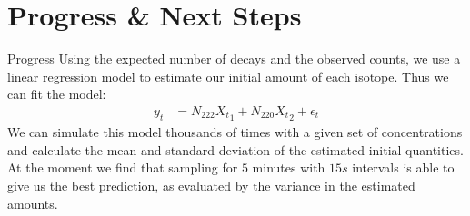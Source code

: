 \documentclass{beamer}
\begin{document}


\section{Progress \& Next Steps}
\begin{frame}{Progress}
    Using the expected number of decays and the observed counts, we use a linear regression model to estimate our initial amount of each isotope. Thus we can fit the model:
    \begin{align*}
        y_t &= N_{222} {X_t}_1 + N_{220} {X_t}_2 + \epsilon_t
    \end{align*}
    We can simulate this model thousands of times with a given set of concentrations and calculate the mean and standard deviation of the estimated initial quantities.\\
    
    \vspace{0.2cm}
    At the moment we find that sampling for $5$ minutes with $15s$ intervals is able to give us the best prediction, as evaluated by the variance in the estimated amounts. 
\end{frame}
\end{document}
